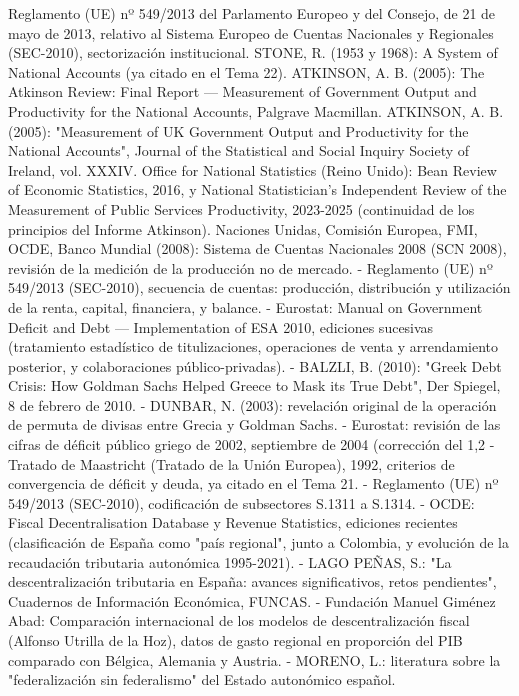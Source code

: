 \documentclass[10pt,a4paper]{article}
\begin{document}
Reglamento (UE) nº 549/2013 del Parlamento Europeo y del Consejo, de 21 de mayo de 2013, relativo al Sistema Europeo de Cuentas Nacionales y Regionales (SEC-2010), sectorización institucional.
STONE, R. (1953 y 1968): A System of National Accounts (ya citado en el Tema 22).
ATKINSON, A. B. (2005): The Atkinson Review: Final Report — Measurement of Government Output and Productivity for the National Accounts, Palgrave Macmillan.
ATKINSON, A. B. (2005): "Measurement of UK Government Output and Productivity for the National Accounts", Journal of the Statistical and Social Inquiry Society of Ireland, vol. XXXIV.
Office for National Statistics (Reino Unido): Bean Review of Economic Statistics, 2016, y National Statistician's Independent Review of the Measurement of Public Services Productivity, 2023-2025 (continuidad de los principios del Informe Atkinson).
Naciones Unidas, Comisión Europea, FMI, OCDE, Banco Mundial (2008): Sistema de Cuentas Nacionales 2008 (SCN 2008), revisión de la medición de la producción no de mercado.
- Reglamento (UE) nº 549/2013 (SEC-2010), secuencia de cuentas: producción, distribución y utilización de la renta, capital, financiera, y balance.
- Eurostat: Manual on Government Deficit and Debt — Implementation of ESA 2010, ediciones sucesivas (tratamiento estadístico de titulizaciones, operaciones de venta y arrendamiento posterior, y colaboraciones público-privadas).
- BALZLI, B. (2010): "Greek Debt Crisis: How Goldman Sachs Helped Greece to Mask its True Debt", Der Spiegel, 8 de febrero de 2010.
- DUNBAR, N. (2003): revelación original de la operación de permuta de divisas entre Grecia y Goldman Sachs.
- Eurostat: revisión de las cifras de déficit público griego de 2002, septiembre de 2004 (corrección del 1,2%
- Tratado de Maastricht (Tratado de la Unión Europea), 1992, criterios de convergencia de déficit y deuda, ya citado en el Tema 21.
- Reglamento (UE) nº 549/2013 (SEC-2010), codificación de subsectores S.1311 a S.1314.
- OCDE: Fiscal Decentralisation Database y Revenue Statistics, ediciones recientes (clasificación de España como "país regional", junto a Colombia, y evolución de la recaudación tributaria autonómica 1995-2021).
- LAGO PEÑAS, S.: "La descentralización tributaria en España: avances significativos, retos pendientes", Cuadernos de Información Económica, FUNCAS.
- Fundación Manuel Giménez Abad: Comparación internacional de los modelos de descentralización fiscal (Alfonso Utrilla de la Hoz), datos de gasto regional en proporción del PIB comparado con Bélgica, Alemania y Austria.
- MORENO, L.: literatura sobre la "federalización sin federalismo" del Estado autonómico español.
\end{document}
